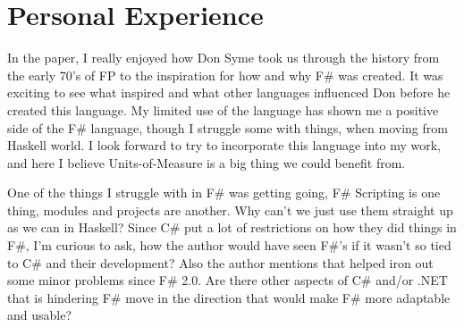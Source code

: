 \documentclass[12pt]{article}
\begin{document}
\section{Personal Experience}

In the paper, I really enjoyed how Don Syme took us through the history from the early 70's of FP to the inspiration for how and why F\# was created. It was exciting to see what inspired and what other languages influenced Don before he created this language. My limited use of the language has shown me a positive side of the F\# language, though I struggle some with things, when moving from Haskell world. I look forward to try to incorporate this language into my work, and here I believe Units-of-Measure is a big thing we could benefit from.


One of the things I struggle with in F\# was getting going, F\# Scripting is one thing, modules and projects are another. Why can't we just use them straight up as we can in Haskell? 
Since C\# put a lot of restrictions on how they did things in F\#, I'm curious to ask, how the author would have seen F\#'s if it wasn't so tied to C\# and their development? Also the author mentions that  helped iron out some minor problems since F\# 2.0. Are there other aspects of C\# and/or .NET that is hindering F\# move in the direction that would make F\# more adaptable and usable? 

\newpage
\printbibliography
\end{document}
